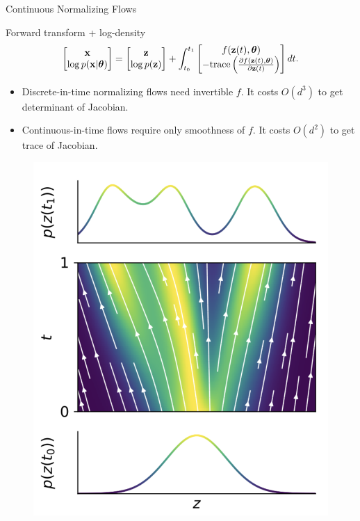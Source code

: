 \begin{frame}{Continuous Normalizing Flows}
	\vspace{-0.6cm}
	\begin{block}{Forward transform + log-density}
		\vspace{-0.8cm}
		\[
			\begin{bmatrix}
				\mathbf{x} \\
				\log p(\mathbf{x} | \boldsymbol{\theta})
			\end{bmatrix}
			= 
			\begin{bmatrix}
				\mathbf{z} \\
				\log p(\mathbf{z})
			\end{bmatrix} + 
			\int_{t_0}^{t_1} 
			\begin{bmatrix}
				f(\mathbf{z}(t), \boldsymbol{\theta}) \\
				- \text{trace} \left( \frac{\partial f(\mathbf{z}(t), \boldsymbol{\theta})}{\partial \mathbf{z}(t)} \right) 
			\end{bmatrix} dt.
		\]
		\vspace{-0.6cm}
	\end{block}
	\begin{itemize}
		\item Discrete-in-time normalizing flows need invertible $f$. It costs $O(d^3)$ to get determinant of Jacobian.
		\item Continuous-in-time flows require only smoothness of $f$. It costs $O(d^2)$ to get trace of Jacobian.
	\end{itemize}
	\vspace{-0.5cm}
	\begin{minipage}[t]{0.4\columnwidth}
		\begin{figure}
			\centering
			\includegraphics[width=0.75\linewidth]{figs/cnf_flow.png}

\end{figure}
\end{minipage}
\end{frame}
